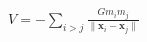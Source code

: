\documentclass[preview]{standalone}
\begin{document}
\begin{align*}
V=-\sum_{i>j} \frac{Gm_im_j}{\|\mathbf x_i - \mathbf x_j\|}
\end{align*}
\end{document}
